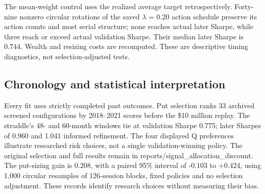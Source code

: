 \documentclass[11pt,letterpaper]{article}
\begin{document}
\begin{center}\small{}\end{center}
The mean-weight control uses the realized average target retrospectively. Forty-nine nonzero circular rotations of the saved \ensuremath{\lambda} = 0.20 action schedule preserve its action counts and most serial structure; none reaches actual later Sharpe, while three reach or exceed actual validation Sharpe. Their median later Sharpe is 0.744. Wealth and resizing costs are recomputed. These are descriptive timing diagnostics, not selection-adjusted tests.

\subsection*{Chronology and statistical interpretation}
Every fit uses strictly completed past outcomes. Put selection ranks 33 archived screened configurations by 2018--2021 scores before the \$10 million replay. The straddle's 48- and 60-month windows tie at validation Sharpe 0.775; later Sharpes of 0.960 and 1.041 informed refinement. The four displayed Q preferences illustrate researched risk choices, not a single validation-winning policy. The original selection and full results remain in reports/signal\_allocation\_discount. The put-sizing gain is 0.208, with a paired 95\% interval of -0.103 to +0.424, using 1,000 circular resamples of 126-session blocks, fixed policies and no selection adjustment. These records identify research choices without measuring their bias.

\clearpage
\end{document}
